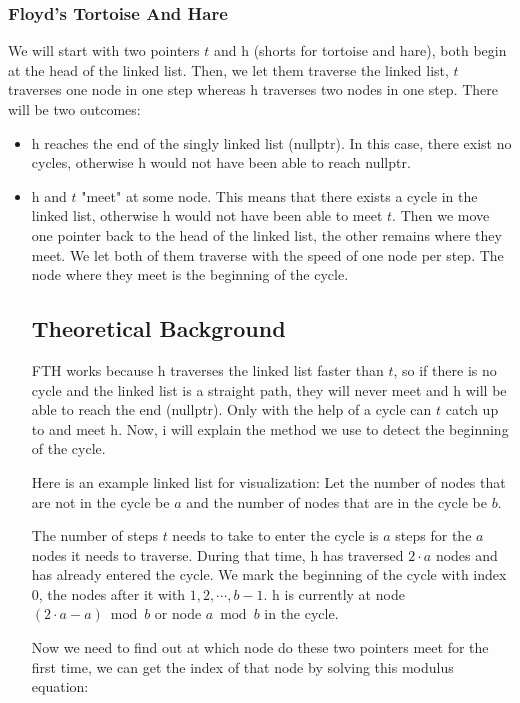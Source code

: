 \documentclass[12pt, letterpaper]{article}
\newcommand{\tortoise}{\textit{t}}
\newcommand{\hare}{\textit{h}}
\begin{document}
\subsubsection{Floyd's Tortoise And Hare}
We will start with two pointers \(\tortoise\) and \(\hare\) (shorts for tortoise and hare), both begin at the head of the linked list. Then, we let them traverse the linked list, \(\tortoise\) traverses one node in one step whereas \(\hare\) traverses two nodes in one step. There will be two outcomes:
\begin{itemize}
\item \(\hare\) reaches the end of the singly linked list (nullptr). In this case, there exist no cycles, otherwise \(\hare\) would not have been able to reach nullptr.
\item \(\hare\) and \(\tortoise\) "meet" at some node. This means that there exists a cycle in the linked list, otherwise \(\hare\) would not have been able to meet \(\tortoise\). Then we move one pointer back to the head of the linked list, the other remains where they meet. We let both of them traverse with the speed of one node per step. The node where they meet is the beginning of the cycle.
\subsection{Theoretical Background}
FTH works because \(\hare\) traverses the linked list faster than \(\tortoise\), so if there is no cycle and the linked list is a straight path, they will never meet and \(\hare\) will be able to reach the end (nullptr). Only with the help of a cycle can \(\tortoise\) catch up to and meet \(\hare\). Now, i will explain the method we use to detect the beginning of the cycle.

Here is an example linked list for visualization:
Let the number of nodes that are not in the cycle be \(a\) and the number of nodes that are in the cycle be \(b\). 

The number of steps \( \tortoise \) needs to take to enter the cycle is \( a \) steps for the \( a \) nodes it needs to traverse. During that time, \( \hare \) has traversed \( 2 \cdot a \) nodes and has already entered the cycle. We mark the beginning of the cycle with index 0, the nodes after it with \( 1, 2, \cdots, b - 1 \). \( \hare \) is currently at node \( (2 \cdot a - a) \bmod b \) or node \( a \bmod b \) in the cycle.


Now we need to find out at which node do these two pointers meet for the first time, we can get the index of that node by solving this modulus equation:


\end{itemize}
\end{document}

